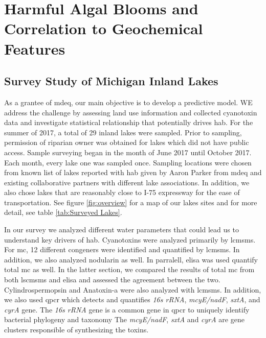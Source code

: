 \chapter{Harmful Algal Blooms and Correlation to Geochemical Features}

\section{Survey Study of Michigan Inland Lakes} 
As a grantee of \gls{mdeq}, our main objective is to develop a predictive model. WE address the challenge by assessing land use information and collected cyanotoxin data and investigate statistical relationship that potentially drives \gls{hab}. For the summer of 2017, a total of 29 inland lakes were sampled. Prior to sampling, permission of riparian owner was obtained for lakes which did not have public access. Sample surveying began in the month of June 2017 until October 2017. Each month, every lake one was sampled once. Sampling locations were chosen from known list of lakes reported with \gls{hab} given by Aaron Parker from \gls{mdeq} and existing collaborative partners with different lake associations. In addition, we also chose lakes that are reasonably close to I-75 expressway for the ease of transportation. See figure \ref{fig:overview} for a map of our lakes sites and for more detail, see table \ref{tab:Surveyed Lakes}.

In our survey we analyzed different water parameters that could lead us to understand key drivers of \gls{hab}. Cyanotoxins were analyzed primarily by \gls{lcmsms}. For \gls{mc}, 12 different congeners were identified and quantified by \gls{lcmsms}. In addition, we also analyzed nodularin as well. In parralell, \gls{elisa} was used quantify total \gls{mc} as well. In the latter section, we compared the results of total \gls{mc} from both \gls{lscmsms} and \gls{elisa} and assessed the agreement between the two. Cylindrospermopsin and Anatoxin-a were also analyzed with \gls{lcmsms}. In addition, we also used \gls{qpcr} which detects and quantifies \emph{16s rRNA}, \emph{mcyE/nadF}, \emph{sxtA}, and \emph{cyrA} gene. The \emph{16s rRNA} gene is a common gene in \gls{qpcr} to uniquely identify bacterial phylogeny and taxonomy \cite{janda_} %
The \emph{mcyE/nadF}, \emph{sxtA} and \emph{cyrA} are gene clusters responsible of synthesizing the toxins. 

